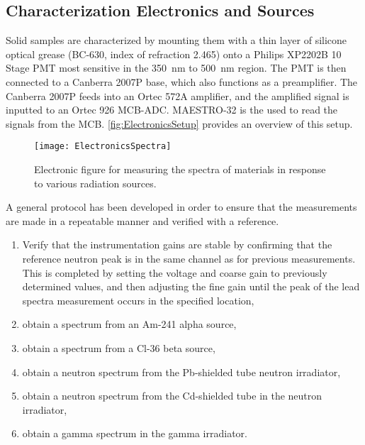 \subsection{Characterization Electronics and Sources}
Solid samples are characterized by mounting them with a thin layer of silicone optical grease (BC-630, index of refraction 2.465) onto a Philips XP2202B 10 Stage PMT most sensitive in the \SI{350}{\nm} to \SI{500}{\nm} region.
The PMT is then connected to a Canberra 2007P base, which also functions as a preamplifier.
The Canberra 2007P feeds into an Ortec 572A amplifier, and the amplified signal is inputted to an Ortec 926 MCB-ADC.
MAESTRO-32 is the used to read the signals from the MCB.
\autoref{fig:ElectronicsSetup} provides an overview of this setup.
\begin{figure}
  \texttt{[image: ElectronicsSpectra]}
  \caption[Optical Characterization Experiment Setup]{Electronic figure for measuring the spectra of materials in response to various radiation sources.}
  \label{fig:ElectronicSetup}
\end{figure}
A general protocol has been developed in order to ensure that the measurements are made in a repeatable manner and verified with a reference.
\begin{enumerate}
  \item Verify that the instrumentation gains are stable by confirming that the reference neutron peak is in the same channel as for previous measurements. This is completed by setting the voltage and coarse gain to previously determined values, and then adjusting the fine gain until the peak of the lead spectra measurement occurs in the specified location,
  \item obtain a spectrum from an Am-241 alpha source,
  \item obtain a spectrum from a Cl-36 beta source,
  \item obtain a neutron spectrum from the Pb-shielded tube neutron irradiator,
  \item obtain a neutron spectrum from the Cd-shielded tube in the neutron irradiator,
  \item obtain a gamma spectrum in the gamma irradiator.
\end{enumerate}

